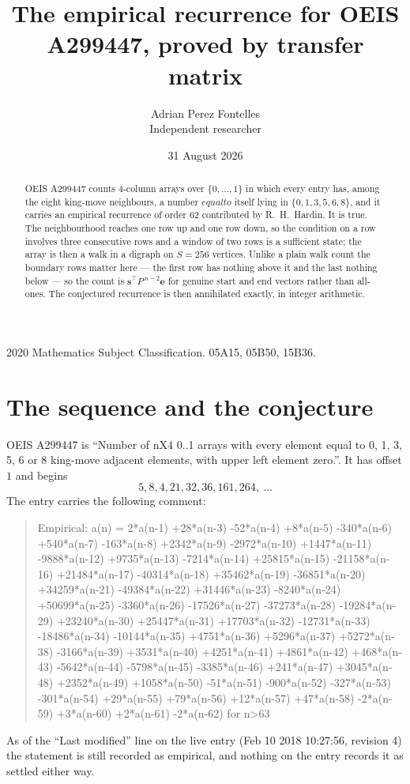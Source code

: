 \documentclass[11pt,a4paper]{article}
\title{The empirical recurrence for OEIS A299447, proved by transfer matrix}
\author{Adrian Perez Fontelles\\ \small Independent researcher}
\date{31 August 2026}
\theoremstyle{plain}
\theoremstyle{definition}
\begin{document}
\maketitle

\begin{abstract}
OEIS A299447 counts $4$-column arrays over $\{0,\dots,1\}$ in which every entry has,
among the eight king-move neighbours, a number $equal to$ itself lying in $\{0,1,3,5,6,8\}$, and it carries an empirical
recurrence of order $62$ contributed by R.~H.~Hardin. It is true. The neighbourhood
reaches one row up and one row down, so the condition on a row involves three consecutive
rows and a window of two rows is a sufficient state; the array is then a walk in a digraph
on $S=256$ vertices. Unlike a plain walk count the boundary rows matter here --- the first
row has nothing above it and the last nothing below --- so the count is
$\mathbf{s}^{\!\top}P^{\,n-2}\mathbf{e}$ for genuine start and end vectors rather than
all-ones. The conjectured recurrence is then annihilated exactly, in integer arithmetic.
\end{abstract}

\noindent\small 2020 Mathematics Subject Classification. 05A15, 05B50, 15B36.\normalsize

\section{The sequence and the conjecture}

OEIS A299447 is ``Number of nX4 0..1 arrays with every element equal to 0, 1, 3, 5, 6 or 8 king-move adjacent elements, with upper left element zero.''. It has offset
$1$ and begins
\[
5, 8, 4, 21, 32, 36, 161, 264,\ \dots
\]
The entry carries the following comment:
\begin{quote}\small
Empirical: a(n) = 2*a(n-1) +28*a(n-3) -52*a(n-4) +8*a(n-5) -340*a(n-6) +540*a(n-7) -163*a(n-8) +2342*a(n-9) -2972*a(n-10) +1447*a(n-11) -9888*a(n-12) +9735*a(n-13) -7214*a(n-14) +25815*a(n-15) -21158*a(n-16) +21484*a(n-17) -40314*a(n-18) +35462*a(n-19) -36851*a(n-20) +34259*a(n-21) -49384*a(n-22) +31446*a(n-23) -8240*a(n-24) +50699*a(n-25) -3360*a(n-26) -17526*a(n-27) -37273*a(n-28) -19284*a(n-29) +23240*a(n-30) +25447*a(n-31) +17703*a(n-32) -12731*a(n-33) -18486*a(n-34) -10144*a(n-35) +4751*a(n-36) +5296*a(n-37) +5272*a(n-38) -3166*a(n-39) +3531*a(n-40) +4251*a(n-41) +4861*a(n-42) +468*a(n-43) -5642*a(n-44) -5798*a(n-45) -3385*a(n-46) +241*a(n-47) +3045*a(n-48) +2352*a(n-49) +1058*a(n-50) -51*a(n-51) -900*a(n-52) -327*a(n-53) -301*a(n-54) +29*a(n-55) +79*a(n-56) +12*a(n-57) +47*a(n-58) -2*a(n-59) +3*a(n-60) +2*a(n-61) -2*a(n-62) for n>63
\end{quote}
As of the ``Last modified'' line on the live entry (Feb 10 2018 10:27:56, revision
4) the statement is still recorded as empirical, and nothing on the entry
records it as settled either way.
\end{document}
